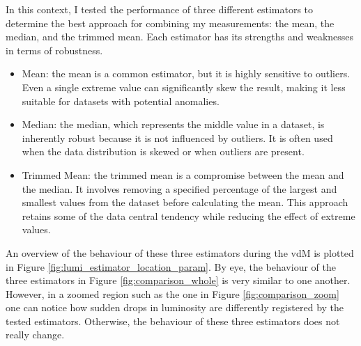 In this context, I tested the performance of three different estimators to determine the best approach for combining my measurements: the mean, the median, and the trimmed mean. Each estimator has its strengths and weaknesses in terms of robustness.

\begin{itemize}
\item Mean: the mean is a common estimator, but it is highly sensitive to outliers. Even a single extreme value can significantly skew the result, making it less suitable for datasets with potential anomalies.
\item Median: the median, which represents the middle value in a dataset, is inherently robust because it is not influenced by outliers. It is often used when the data distribution is skewed or when outliers are present.
\item Trimmed Mean: the trimmed mean is a compromise between the mean and the median. It involves removing a specified percentage of the largest and smallest values from the dataset before calculating the mean. This approach retains some of the data central tendency while reducing the effect of extreme values.
\end{itemize}


An overview of the behaviour of these three estimators during the vdM is plotted in Figure \ref{fig:lumi_estimator_location_param}. By eye, the behaviour of the three estimators in Figure \ref{fig:comparison_whole} is very similar to one another. However, in a zoomed region such as the one in Figure \ref{fig:comparison_zoom} one can notice how sudden drops in luminosity are differently registered by the tested estimators. Otherwise, the behaviour of these three estimators does not really change.
 

